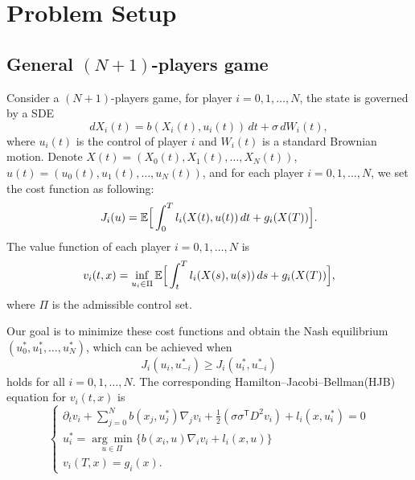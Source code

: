 \documentclass{article}
\begin{document}
 
\section{Problem Setup}

\subsection{General $(N+1)$-players game}

Consider a $(N+1)$-players game, for player $i = 0, 1, \dots, N$, the state is governed by a SDE
\begin{equation} \label{state of N+1 player game}
    d X_{i}(t) = b(X_{i}(t), u_{i}(t)) \, d t + \sigma \, d W_{i}(t),
\end{equation}
where $u_{i} (t)$ is the control of player $i$ and $W_{i}(t)$ is a standard Brownian motion. Denote $X(t) = (X_{0}(t), X_{1}(t), \dots, X_{N}(t))$,  $u(t) = (u_{0}(t), u_{1}(t), \dots, u_{N}(t))$, and for each player $i = 0, 1, \dots, N$, we set the cost function as following:
\begin{equation} \label{cost function of of N+1 player game}
    J_{i}(u) = \mathbb{E} \Big{[} \int_{0}^{T} l_{i}(X(t), u(t)) \, d t + g_{i}(X(T)) \Big{]}.
\end{equation}
The value function of each player $i = 0, 1, \dots, N$ is
\begin{equation*} \label{value function of N+1 player game}
    v_{i} (t,x) = \inf_{u_{i} \in \Pi} \mathbb{E} \Big{[} \int_{t}^{T} l_{i}(X(s), u(s)) \, d s + g_{i}(X(T)) \Big{]},
\end{equation*}
where $\Pi$ is the admissible control set.

Our goal is to minimize these cost functions and obtain the Nash equilibrium $(u_{0}^{*}, u_{1}^{*}, \dots, u_{N}^{*})$, which can be achieved when 
\begin{equation} \label{eq: Nash equilibrium of N+1 player game}
    J_{i}(u_{i}, u_{-i}^{*}) \geq J_{i}(u_{i}^{*}, u_{-i}^{*})
\end{equation}
holds for all $i = 0, 1, \dots, N$. The corresponding Hamilton–Jacobi–Bellman(HJB) equation for $v_{i}(t, x)$ is
\begin{equation} \label{HJB of N+1 player game}
    \begin{cases}
    \partial_{t} v_{i} + \sum_{j = 0}^{N} b(x_{j}, u_{j}^{*}) \nabla_{j} v_{i} + \frac{1}{2} (\sigma \sigma^\mathsf{T} D^{2} v_{i}) + l_{i}(x, u_{i}^{*}) = 0 \\
    u_{i}^{*} = \underset{u \in \Pi}{\arg\min} \{b(x_{i}, u) \nabla_{i} v_{i} + l_{i}(x, u) \} \\
    v_{i} (T, x) = g_{i} (x).
    \end{cases}
\end{equation}
\end{document}
